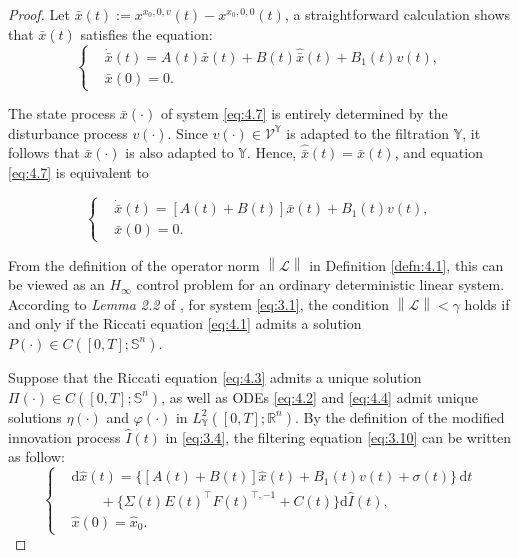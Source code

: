\documentclass[lettersize,journal]{IEEEtran}
\theoremstyle{plain}
\theoremstyle{definition}
\begin{document}
\begin{proof}
	Let $\bar{x}(t) := x^{x_0,0,v}(t) - x^{x_0,0,0}(t)$, a straightforward calculation shows that $\bar{x}(t)$ satisfies the equation:
	\begin{equation}\label{eq:4.7}
		\left\{
		\begin{aligned}
			&\dot{\bar{x}}(t) = A(t)\bar{x}(t) + B(t)\widehat{\bar{x}}(t) + B_1(t)v(t),\\
			&\bar{x}(0) = 0.
		\end{aligned}
		\right.
	\end{equation}
	
	The state process $\bar{x}(\cdot)$ of system \eqref{eq:4.7} is entirely determined by the disturbance process $v(\cdot)$. Since $v(\cdot) \in \mathcal{V}^{\mathbb{Y}}$ is adapted to the filtration $\mathbb{Y}$, it follows that $\bar{x}(\cdot)$ is also adapted to $\mathbb{Y}$. Hence, $\widehat{\bar{x}}(t)=\bar{x}(t)$, and equation \eqref{eq:4.7} is equivalent to 
	
	\begin{equation*}
		\left\{
		\begin{aligned}
			&\dot{\bar{x}}(t) = [A(t) + B(t)]\bar{x}(t) + B_1(t)v(t),\\
			&\bar{x}(0) = 0.
		\end{aligned}
		\right.
	\end{equation*}
	
	From the definition of the operator norm $\left\|\mathcal{L}\right\|$ in Definition \ref{defn:4.1}, this can be viewed as an $H_\infty$ control problem for an ordinary deterministic linear system. According to \textit{Lemma 2.2} of \cite{Limebeer1994}, for system \eqref{eq:3.1}, the condition $\left\|\mathcal{L}\right\| < \gamma$ holds if and only if the Riccati equation \eqref{eq:4.1} admits a solution $P(\cdot) \in C([0,T];\mathbb{S}^n)$.
	
	Suppose that the Riccati equation \eqref{eq:4.3} admits a unique solution $\Pi(\cdot) \in C([0,T];\mathbb{S}^n)$, as well as ODEs \eqref{eq:4.2} and \eqref{eq:4.4} admit unique solutions $\eta(\cdot)$ and $\varphi(\cdot)$ in $L^2_{\mathbb{Y}}([0,T];\mathbb{R}^n)$. By the definition of the modified innovation process $\widehat{I}(t)$ in \eqref{eq:3.4}, the filtering equation \eqref{eq:3.10} can be written as follow:
	\begin{equation*}
		\left\{
		\begin{aligned}
			&\mathrm{d}\widehat{x}(t) = \Big\{[A(t) + B(t)]\widehat{x}(t) + B_1(t)v(t) + \sigma(t)\Big\}\,\mathrm{d}t \\
			&\qquad + \Big\{\Sigma(t)E(t)^{\top}F(t)^{\top,-1} + C(t)\Big\}\mathrm{d}\widehat{I}(t),\\
			&\widehat{x}(0) = \widehat{x}_0.
		\end{aligned}
		\right.
	\end{equation*}
	

\end{proof}
\end{document}
